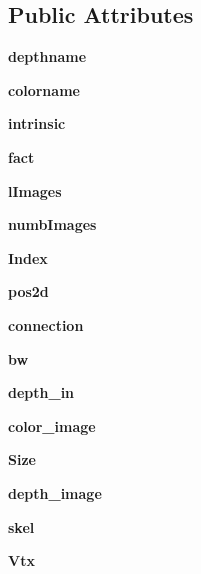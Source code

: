 \subsection*{Public Attributes}
\begin{DoxyCompactItemize}
\item 
\mbox{\label{class_r_g_b_d_1_1_r_g_b_d_ae0f6b526326cac02ef2c9d3552f7a800}} 
{\bfseries depthname}
\item 
\mbox{\label{class_r_g_b_d_1_1_r_g_b_d_aa562f60e3cf12d385afcf87558eede48}} 
{\bfseries colorname}
\item 
\mbox{\label{class_r_g_b_d_1_1_r_g_b_d_ac210fa33491589196e210c8eb01247b6}} 
{\bfseries intrinsic}
\item 
\mbox{\label{class_r_g_b_d_1_1_r_g_b_d_a68e02d73c0d94fa0cb095211fbf389e2}} 
{\bfseries fact}
\item 
\mbox{\label{class_r_g_b_d_1_1_r_g_b_d_a43c9017b008f6e10bb97992527b21710}} 
{\bfseries l\+Images}
\item 
\mbox{\label{class_r_g_b_d_1_1_r_g_b_d_aac3bc14caf75edd0176e8fcf3d871487}} 
{\bfseries numb\+Images}
\item 
\mbox{\label{class_r_g_b_d_1_1_r_g_b_d_a160afd7c2f0b82240d96d748b4dc952b}} 
{\bfseries Index}
\item 
\mbox{\label{class_r_g_b_d_1_1_r_g_b_d_aae980a4526fa9b63e7621fe7923e99f3}} 
{\bfseries pos2d}
\item 
\mbox{\label{class_r_g_b_d_1_1_r_g_b_d_adabfdc2652b9dd3fb1687928bc23b471}} 
{\bfseries connection}
\item 
\mbox{\label{class_r_g_b_d_1_1_r_g_b_d_a8f148e536d8bc8fc223f33c163c4ebb2}} 
{\bfseries bw}
\item 
\mbox{\label{class_r_g_b_d_1_1_r_g_b_d_a4f8dd1fbad2056bf30dc0bb16643560b}} 
{\bfseries depth\+\_\+in}
\item 
\mbox{\label{class_r_g_b_d_1_1_r_g_b_d_a1e5163fcd76a2c95710ec20187a0acd8}} 
{\bfseries color\+\_\+image}
\item 
\mbox{\label{class_r_g_b_d_1_1_r_g_b_d_ae1cfeac789474f32593196e41f6be6fa}} 
{\bfseries Size}
\item 
\mbox{\label{class_r_g_b_d_1_1_r_g_b_d_a6462c5a17e18aee53b5379fb3a331444}} 
{\bfseries depth\+\_\+image}
\item 
\mbox{\label{class_r_g_b_d_1_1_r_g_b_d_aeecce03148f74fcdc0e7308924f2bcd5}} 
{\bfseries skel}
\item 
\mbox{\label{class_r_g_b_d_1_1_r_g_b_d_acf6e4ef08aeff1a0c492d8e761b1b8fc}} 
{\bfseries Vtx}
\item 

\end{DoxyCompactItemize}
